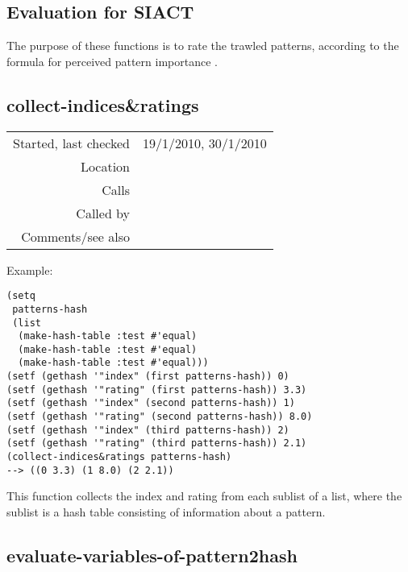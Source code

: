 \subsection{Evaluation for SIACT}\label{sec:evaluation-for-SIACT}

The purpose of these functions is to rate the trawled
patterns, according to the formula for perceived
pattern importance \citep{collins2011a}.


\subsection*{collect-indices\&ratings}\label{fun:collect-indices-and-ratings}

\vspace{0.3cm}
\begin{tabular}{r|p{8cm}}
Started, last checked & 19/1/2010, 30/1/2010 \\
Location & \nameref{sec:evaluation-for-SIACT} \\
Calls & \\
Called by & \nameref{fun:evaluate-variables-of-patterns2hash} \\
Comments/see also &
\end{tabular}

\vspace{0.5cm}
\noindent Example:
\begin{verbatim}
(setq
 patterns-hash
 (list
  (make-hash-table :test #'equal)
  (make-hash-table :test #'equal)
  (make-hash-table :test #'equal)))
(setf (gethash '"index" (first patterns-hash)) 0)
(setf (gethash '"rating" (first patterns-hash)) 3.3)
(setf (gethash '"index" (second patterns-hash)) 1)
(setf (gethash '"rating" (second patterns-hash)) 8.0)
(setf (gethash '"index" (third patterns-hash)) 2)
(setf (gethash '"rating" (third patterns-hash)) 2.1)
(collect-indices&ratings patterns-hash)
--> ((0 3.3) (1 8.0) (2 2.1))
\end{verbatim}

\noindent This function collects the index and rating
from each sublist of a list, where the sublist is a
hash table consisting of information about a
pattern.


\subsection*{evaluate-variables-of-pattern2hash}\label{fun:evaluate-variables-of-pattern2hash}

